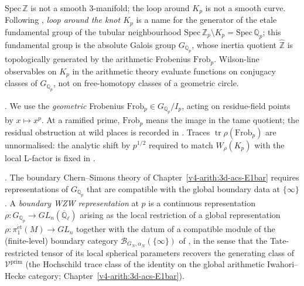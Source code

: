 \begin{remark}
\label{v4-arith:w9-r1:rem:no-geometric-loop}
\(\mathrm{Spec}\,\mathbb Z\) is not a smooth 3-manifold; the loop around
\(K_{p}\) is not a smooth curve. Following
, \emph{loop around the knot
\(K_{p}\)} is a name for the generator of the etale fundamental group of
the tubular neighbourhood
\(\mathrm{Spec}\,\mathbb Z_{p}\setminus K_{p}=
\mathrm{Spec}\,\mathbb Q_{p}\); this fundamental group is the absolute
Galois group \(G_{\mathbb Q_{p}}\), whose inertia
quotient \(\widehat{\mathbb Z}\) is topologically generated by the
arithmetic Frobenius \(\mathrm{Frob}_{p}\). Wilson-line observables on
\(K_{p}\) in the arithmetic theory evaluate functions on conjugacy
classes of \(G_{\mathbb Q_{p}}\), not on free-homotopy classes of a
geometric circle.
\end{remark}

\begin{convention}
\label{v4-arith:w9-r1:conv:frob}
\ClaimStatusDefinitional. We use the \emph{geometric} Frobenius
\(\mathrm{Frob}_{p}\in G_{\mathbb Q_{p}}/I_{p}\), acting on residue-field
points by \(x\mapsto x^{p}\). At a ramified prime, \(\mathrm{Frob}_{p}\)
means the image in the tame quotient; the residual obstruction at wild
places is recorded in . Traces
\(\operatorname{tr}\rho(\mathrm{Frob}_{p})\) are unnormalised: the
analytic shift by \(p^{1/2}\) required to match
\(W_{\rho}(K_{p})\) with the local L-factor is fixed in
.
\end{convention}

\begin{definition}
\label{v4-arith:w9-r1:def:boundary-rep}
\ClaimStatusDefinitional. The boundary Chern--Simons theory of
Chapter~\ref{v4-arith:3d-acs-E1bar} requires representations of
\(G_{\mathbb Q_{p}}\) that are compatible with the global boundary data
at \(\{\infty\}\). A \emph{boundary WZW representation} at \(p\) is a
continuous representation
\(\rho\colon G_{\mathbb Q_{p}}\to GL_{n}(\overline{\mathbb Q}_{\ell})\)
arising as the local restriction of a global representation
\(\rho\colon\pi_{1}^{\mathrm{\acute et}}(M)\to GL_{n}\) together with the
datum of a compatible module of the (finite-level) boundary category
\(\mathcal B_{G_{N},\alpha_{N}}(\{\infty\})\) of
, in the sense that
the Tate-restricted tensor of its local spherical parameters recovers
the generating class of
\(\mathcal V^{\mathrm{prim}}\) (the Hochschild trace class of the identity
on the global arithmetic Iwahori--Hecke category;
Chapter~\ref{v4-arith:3d-acs-E1bar}).
\end{definition}

